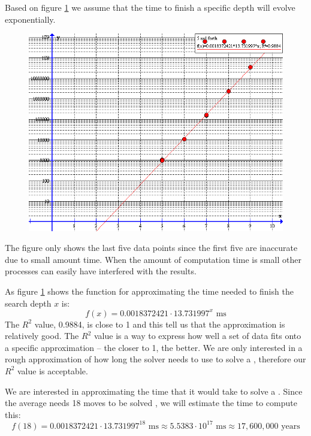 Based on figure \ref{fig:timeFunction} we assume that the time to finish a specific depth will evolve exponentially.

\begin{figure}[h]
	\centering
		\includegraphics[scale=0.5]{input/pics/timeFunction}
	\caption{}
	\label{fig:timeFunction}
\end{figure}

The figure only shows the last five data points since the first five are inaccurate due to small amount time.
When the amount of computation time is small other processes can easily have interfered with the results. 


As figure \ref{fig:timeFunction} shows the function for approximating the time needed to finish the search depth $x$ is:
\[
f(x)=0.0018372421 \cdot 13.731997^{x} \text{ ms}
\]
The $R^2$ value, 0.9884, is close to 1 and this tell us that the approximation is relatively good. 
The $R^2$ value is a way to express how well a set of data fits onto a specific approximation -- the closer to 1, the better. 
We are only interested in a rough approximation of how long the solver needs to use to solve a \rubik{}, therefore our $R^2$ value is acceptable.

We are interested in approximating the time that it would take to solve a \rubik{}. Since the average \rubik{} needs 18 moves to be solved \cite{kociemba09}, we will estimate the time to compute this:
\[
f(18) = 0.0018372421 \cdot 13.731997^{18} \text{ ms} \approx 5.5383 \cdot 10^{17} \text{ ms} \approx 17,600,000 \text{ years}
\]

